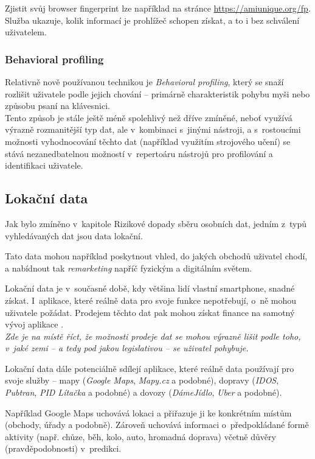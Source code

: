 Zjistit svůj browser fingerprint lze například na stránce \url{https://amiunique.org/fp}. Služba ukazuje, kolik informací je prohlížeč schopen získat, a to i bez schválení uživatelem. 

\subsubsection*{Behavioral profiling}
Relativně nově používanou technikou je \textit{Behavioral profiling}, který se snaží rozlišit uživatele podle jejich chování -- primárně charakteristik pohybu myši nebo způsobu psaní na klávesnici\citep{behavioral-profiling}\citep{mouse-behavioral-biometrics}\citep{digital-behavior-fingerprint}.\\
Tento způsob je stále ještě méně spolehlivý než dříve zmíněné, neboť využívá výrazně rozmanitější typ dat, ale v~kombinaci s~jinými nástroji, a s~rostoucími možnosti vyhodnocování těchto dat (například využitím strojového učení) se stává nezanedbatelnou možností v~repertoáru nástrojů pro profilování a identifikaci uživatele.

\subsection{Lokační data}
Jak bylo zmíněno v~kapitole Rizikové dopady sběru osobních dat, jedním z~typů vyhledávaných dat jsou data lokační.

Tato data mohou například poskytnout vhled, do jakých obchodů uživatel chodí, a nabídnout tak \textit{remarketing} napříč fyzickým a digitálním světem.

Lokační data je v~současné době, kdy většina lidí vlastní smartphone, snadné získat. I~aplikace, které reálně data pro svoje funkce nepotřebují, o~ně mohou uživatele požádat. Prodejem těchto dat pak mohou získat finance na samotný vývoj aplikace .\\
\textit{Zde je na místě říct, že možnosti prodeje dat se mohou výrazně lišit podle toho, v~jaké zemi -- a tedy pod jakou legislativou -- se uživatel pohybuje.}

Lokační data dále potenciálně sdílejí aplikace, které reálně data používají pro svoje služby -- mapy (\textit{Google Maps}, \textit{Mapy.cz} a podobné), dopravy (\textit{IDOS}, \textit{Pubtran}, \textit{PID Lítačka} a podobné) a dovozy (\textit{DámeJídlo}, \textit{Uber}  a podobné).

Například Google Maps uchovává lokaci a přiřazuje ji ke konkrétním místům (obchody, úřady a podobně). Zároveň uchovává informaci o~předpokládané formě aktivity (např. chůze, běh, kolo, auto, hromadná doprava) včetně důvěry (pravděpodobnosti) v~predikci.

